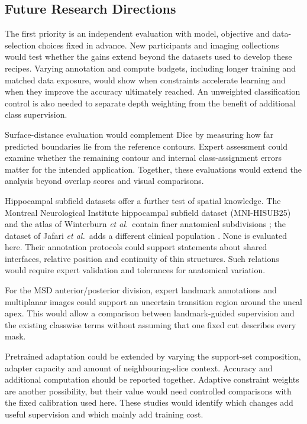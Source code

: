 \documentclass[12pt,a4paper]{article}
\begin{document}
\subsection{Future Research Directions}\label{sec:future-work}
\label{sec:pending-results}

The first priority is an independent evaluation with model,
objective and data-selection choices fixed in advance. New participants
and imaging collections would test whether the gains extend beyond the
datasets used to develop these recipes. Varying annotation and compute
budgets, including longer training and matched data exposure, would
show when constraints accelerate learning and when they improve the
accuracy ultimately reached. An unweighted classification control is
also needed to separate depth weighting from the benefit of additional
class supervision.

Surface-distance evaluation would complement Dice by measuring how far
predicted boundaries lie from the reference contours. Expert assessment
could examine whether the remaining contour and internal class-assignment
errors matter for the intended application. Together, these evaluations
would extend the analysis beyond overlap scores and visual comparisons.

Hippocampal subfield datasets offer a further test of spatial knowledge.
The Montreal Neurological Institute hippocampal subfield dataset
(MNI-HISUB25) and the atlas of Winterburn \emph{et al.}\ contain finer
anatomical subdivisions
\cite{kulaga2015subfields,winterburn2013atlas}; the dataset of
Jafari \emph{et al.}\ adds a different clinical population
\cite{jafari2011dataset}. None is evaluated here. Their annotation
protocols could support statements about shared interfaces, relative
position and continuity of thin structures. Such relations would
require expert validation and tolerances for anatomical variation.

For the MSD anterior/posterior division, expert landmark annotations
and multiplanar images could support an uncertain transition region
around the uncal apex. This would allow a comparison between
landmark-guided supervision and the existing classwise terms without
assuming that one fixed cut describes every mask.

Pretrained adaptation could be extended by varying the support-set
composition, adapter capacity and amount of neighbouring-slice context.
Accuracy and additional computation should be reported together.
Adaptive constraint weights are another possibility, but their value
would need controlled comparisons with the fixed calibration used here.
These studies would identify which changes add useful supervision and
which mainly add training cost.
\end{document}
